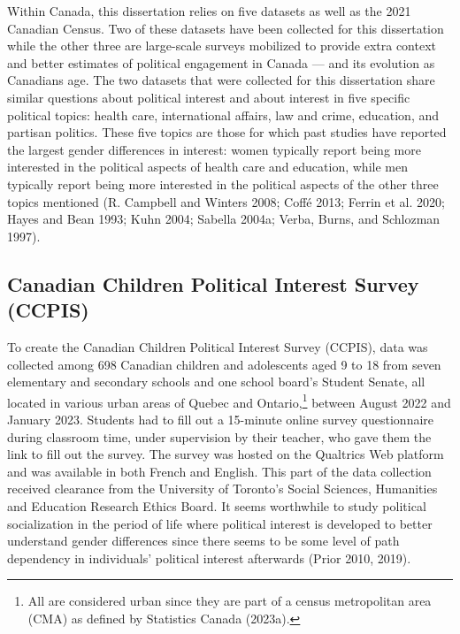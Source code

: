 \documentclass[
  letterpaper,
  DIV=11,
  numbers=noendperiod]{scrreprt}
\begin{document}
Within Canada, this dissertation relies on five datasets as well as the
2021 Canadian Census. Two of these datasets have been collected for this
dissertation while the other three are large-scale surveys mobilized to
provide extra context and better estimates of political engagement in
Canada --- and its evolution as Canadians age. The two datasets that
were collected for this dissertation share similar questions about
political interest and about interest in five specific political topics:
health care, international affairs, law and crime, education, and
partisan politics. These five topics are those for which past studies
have reported the largest gender differences in interest: women
typically report being more interested in the political aspects of
health care and education, while men typically report being more
interested in the political aspects of the other three topics mentioned
(R. Campbell and Winters 2008; Coffé 2013; Ferrin et al. 2020; Hayes and
Bean 1993; Kuhn 2004; Sabella 2004a; Verba, Burns, and Schlozman 1997).

\subsection{Canadian Children Political Interest Survey
(CCPIS)}\label{canadian-children-political-interest-survey-ccpis}

To create the Canadian Children Political Interest Survey (CCPIS), data
was collected among 698 Canadian children and adolescents aged 9 to 18
from seven elementary and secondary schools and one school board's
Student Senate, all located in various urban areas of Quebec and
Ontario,\footnote{All are considered urban since they are part of a
  census metropolitan area (CMA) as defined by Statistics Canada
  (2023a).} between August 2022 and January 2023. Students had to fill
out a 15-minute online survey questionnaire during classroom time, under
supervision by their teacher, who gave them the link to fill out the
survey. The survey was hosted on the Qualtrics Web platform and was
available in both French and English. This part of the data collection
received clearance from the University of Toronto's Social Sciences,
Humanities and Education Research Ethics Board. It seems worthwhile to
study political socialization in the period of life where political
interest is developed to better understand gender differences since
there seems to be some level of path dependency in individuals'
political interest afterwards (Prior 2010, 2019).
\end{document}
